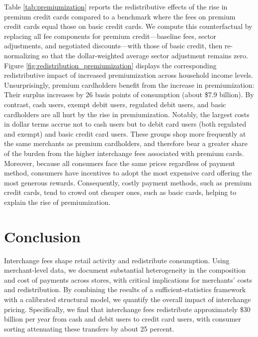 \documentclass[11pt,english]{article}
\theoremstyle{remark}
\begin{document}
Table \ref{tab:premiumization} reports the redistributive effects of the rise in premium credit cards compared to a benchmark where the fees on premium credit cards equal those on basic credit cards.
We compute this counterfactual by replacing all fee components for premium credit---baseline fees, sector adjustments, and negotiated discounts---with those of basic credit, then re-normalizing so that the dollar-weighted average sector adjustment remains zero.
Figure \ref{fig:redistribution_premiumization} displays the corresponding redistributive impact of increased premiumization across household income levels.
Unsurprisingly, premium cardholders benefit from the increase in premiumization: Their surplus increases by 26 basis points of consumption (about \$7.9 billion).
By contrast, cash users, exempt debit users, regulated debit users, and basic cardholders are all hurt by the rise in premiumization.
Notably, the largest costs in dollar terms accrue not to cash users but to debit card users (both regulated and exempt) and basic credit card users.
These groups shop more frequently at the same merchants as premium cardholders, and therefore bear a greater share of the burden from the higher interchange fees associated with premium cards.
Moreover, because all consumers face the same prices regardless of payment method, consumers have incentives to adopt the most expensive card offering the most generous rewards.
Consequently, costly payment methods, such as premium credit cards, tend to crowd out cheaper ones, such as basic cards, helping to explain the rise of premiumization.



\section{Conclusion\label{sec:conclusion}}

Interchange fees shape retail activity and redistribute consumption.
Using merchant-level data, we document substantial heterogeneity in the composition and cost of payments across stores, with critical implications for merchants' costs and redistribution.
By combining the results of a sufficient-statistics framework with a calibrated structural model, we quantify the overall impact of interchange pricing.
Specifically, we find that interchange fees redistribute approximately \$30 billion per year from cash and debit users to credit card users, with consumer sorting attenuating these transfers by about 25 percent.
\end{document}
